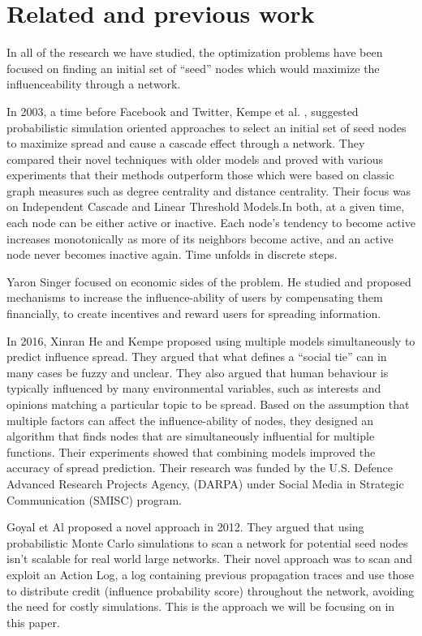 \documentclass{acm_proc_article-sp}
\begin{document}
\section{Related and previous work}

In all of the research we have studied, the optimization problems have been focused on finding an initial set of “seed” nodes which would maximize the influenceability through a network.

In 2003, a time before Facebook and Twitter, Kempe et al. \cite{kempe:maxspread}, suggested probabilistic simulation oriented approaches to select an initial set of seed nodes to maximize spread and cause a cascade effect through a network. They compared their novel techniques with older models and proved with various experiments that their methods outperform those which were based on classic graph measures such as degree centrality and distance centrality. Their focus was on Independent Cascade and Linear Threshold Models.In both, at a given time, each node can be either active or inactive. Each node's tendency to become active increases monotonically as more of its neighbors become active, and an active node never becomes inactive again. Time unfolds in discrete steps.

Yaron Singer \cite{singer:winfriends} focused on economic sides of the problem. He studied and proposed mechanisms to increase the influence-ability of users by compensating them financially, to create incentives and reward users for spreading information.

In 2016, Xinran He and Kempe \cite{DBLP:journals/corr/HeK16} proposed using multiple models simultaneously to predict influence spread. They argued that what defines a “social tie” can in many cases be fuzzy and unclear. They also argued that human behaviour is typically influenced by many environmental variables, such as interests and opinions matching a particular topic to be spread. Based on the assumption that multiple factors can affect the influence-ability of nodes, they designed an algorithm that finds nodes that are simultaneously influential for multiple functions. Their experiments showed that combining models improved the accuracy of spread prediction. Their research was funded by the U.S. Defence Advanced Research Projects Agency, (DARPA) under Social Media in Strategic Communication (SMISC) program.


Goyal et Al \cite{goyal:datainfluence} proposed a novel approach in 2012. They argued that using probabilistic Monte Carlo simulations to scan a network for potential seed nodes isn't scalable for real world large networks. Their novel approach was to scan and exploit an Action Log, a log containing previous propagation traces and use those to distribute credit (influence probability score) throughout the network, avoiding the need for costly simulations. This is the approach we will be focusing on in this paper.
\end{document}
